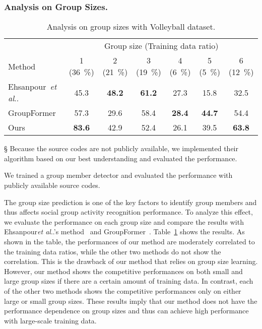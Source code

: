 \documentclass[runningheads]{llncs}
\makeatletter
\DeclareRobustCommand\onedot{\futurelet\@let@token\@onedot}
\def\@onedot{\ifx\@let@token.\else.\null\fi\xspace}
\def\etal{\emph{et al}\onedot}
\makeatother
\begin{document}
\subsubsection{Analysis on Group Sizes.}
\begin{table}[t]
 \caption{Analysis on group sizes with Volleyball dataset.}
 \label{table:analysis_gsize}
 \centering
 \setlength{\tabcolsep}{5pt}
 \begin{threeparttable}
  \begin{tabular}{@{}lcccccc@{}}
   \toprule
   & \multicolumn{6}{c}{Group size (Training data ratio)} \\
   Method & 1 (\SI{36}{\percent}) & 2 (\SI{21}{\percent}) & 3 (\SI{19}{\percent}) & 4 (\SI{6}{\percent}) & 5 (\SI{5}{\percent}) & 6 (\SI{12}{\percent}) \\
   \midrule
   Ehsanpour~\etal~\cite{ehsanpour_eccv2020}\tnote{\S} & 45.3 & \textbf{48.2} & \textbf{61.2} & 27.3 & 15.8 & 32.5 \\
   GroupFormer~\cite{li_iccv2021}\tnote{\ddag} & 57.3 & 29.6 & 58.4 & \textbf{28.4} & \textbf{44.7} & 54.4 \\
   \midrule
   Ours & \textbf{83.6} & 42.9 & 52.4 & 26.1 & 39.5 & \textbf{63.8} \\
   \bottomrule
  \end{tabular}
  \begin{tablenotes}\footnotesize
   \item[\S] Because the source codes are not publicly available, we implemented their algorithm based on our best understanding and evaluated the performance.
   \item[\ddag] We trained a group member detector and evaluated the performance with publicly available source codes.
  \end{tablenotes}
 \end{threeparttable}
 \vspace{-1.0em}
\end{table}

The group size prediction is one of the key factors to identify group members and thus affects social group activity recognition performance. To analyze this effect, we evaluate the performance on each group size and compare the results with Ehsanpour\etal's method~\cite{ehsanpour_eccv2020} and GroupFormer~\cite{li_iccv2021}.
Table~\ref{table:analysis_gsize} shows the results. As shown in the table, the performances of our method are moderately correlated to the training data ratios, while the other two methods do not show the correlation. This is the drawback of our method that relies on group size learning. However, our method shows the competitive performances on both small and large group sizes if there are a certain amount of training data. In contrast, each of the other two methods shows the competitive performances only on either large or small group sizes. These results imply that our method does not have the performance dependence on group sizes and thus can achieve high performance with large-scale training data.
 
\end{document}
